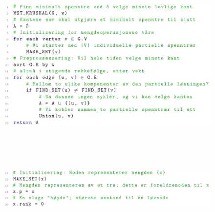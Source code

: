 \documentclass[12pt]{report}
\begin{document}

\begin{figure}[H]
	\begin{Center}
		\includegraphics[width=6.3in,height=3.73in]{./media/image185.png}
	\end{Center}
\end{figure}



\par


\vspace{\baselineskip}



\begin{figure}[H]
	\begin{Center}
		\includegraphics[width=6.3in,height=1.16in]{./media/image186.png}
	\end{Center}
\end{figure}



\par
\end{document}
